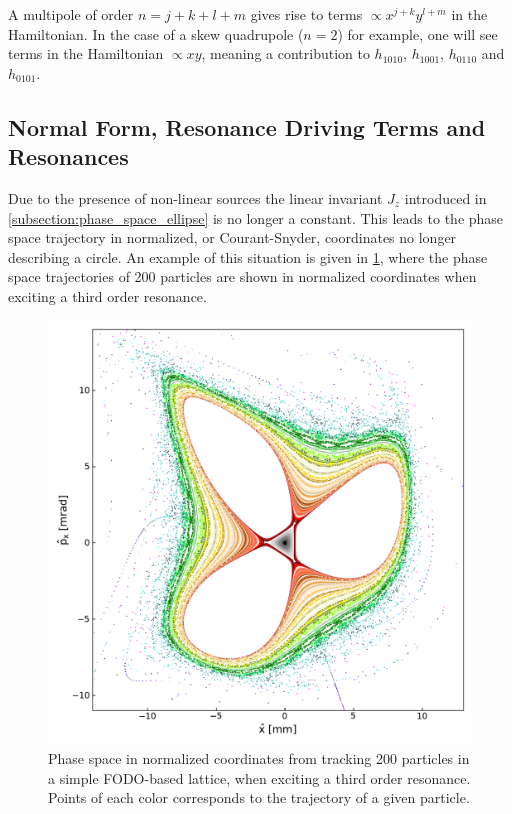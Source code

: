A multipole of order \(n = j + k + l + m\) gives rise to terms \(\propto x^{j+k} y^{l+m}\) in the Hamiltonian.
In the case of a skew quadrupole (\(n=2\)) for example, one will see terms in the Hamiltonian \(\propto xy\), meaning a contribution to \(h_{1010}\), \(h_{1001}\), \(h_{0110}\) and \(h_{0101}\).

\subsection{Normal Form, Resonance Driving Terms and Resonances}
\label{subsection:normal_form_and_rdt}

Due to the presence of non-linear sources the linear invariant \(J_z\) introduced in \cref{subsection:phase_space_ellipse} is no longer a constant.
This leads to the phase space trajectory in normalized, or Courant-Snyder, coordinates no longer describing a circle.
An example of this situation is given in \cref{figure:phase_space_third_order_resonance}, where the phase space trajectories of \num{200} particles are shown in normalized coordinates when exciting a third order resonance.

\begin{figure}[!htb]
    \centering
    \includegraphics[width = 0.9\linewidth]{Figures/Beam_Dynamics_Theory/phase_space_third_order_resonance.pdf}
    \caption{Phase space in normalized coordinates from tracking \num{200} particles in a simple FODO-based lattice, when exciting a third order resonance. Points of each color corresponds to the trajectory of a given particle. }
    \label{figure:phase_space_third_order_resonance}
\end{figure}

